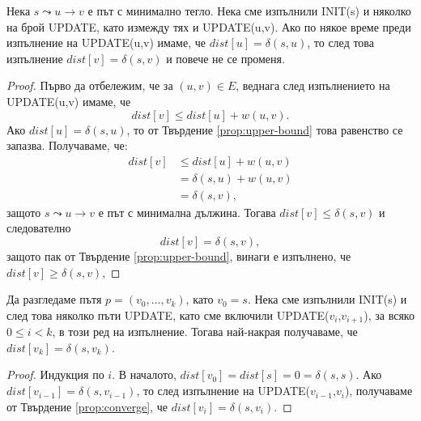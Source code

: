 \begin{prop}
  \label{prop:converge}
  Нека $s\leadsto u \to v$ е път с минимално тегло.
  Нека сме изпълнили INIT(s) и няколко на брой UPDATE, като измежду тях и UPDATE(u,v).
  Ако по някое време преди изпълнение на UPDATE(u,v) 
  имаме, че $dist[u] = \delta(s,u)$, то след това изпълнение
  $dist[v] = \delta(s,v)$ и повече не се променя.
\end{prop}
\begin{proof}
  Първо да отбележим, че за $(u,v) \in E$, веднага след изпълнението на UPDATE(u,v) имаме, че
  \[dist[v] \leq dist[u] + w(u,v).\]
  Ако $dist[u] = \delta(s,u)$, то от Твърдение \ref{prop:upper-bound} това равенство се запазва.
  Получаваме, че:
  \begin{align*}
    dist[v] & \leq dist[u] + w(u,v)\\
    & = \delta(s,u) + w(u,v)\\
    & = \delta(s,v),
  \end{align*}
  защото $s\leadsto u \to v$ е път с минимална дължина.
  Тогава $dist[v] \leq \delta(s,v)$ и следователно 
  \[dist[v] = \delta(s,v),\]
  защото пак от Твърдение \ref{prop:upper-bound}, винаги е изпълнено, че $dist[v] \geq \delta(s,v)$,
\end{proof}

\begin{prop}
  \label{prop:path-update}
  Да разгледаме пътя $p = (v_0,\dots,v_k)$, като $v_0 = s$.
  Нека сме изпълнили INIT(s) и след това няколко пъти UPDATE, като сме включили 
  UPDATE($v_{i}$,$v_{i+1}$), за всяко $0\leq i < k$, в този ред на изпълнение.
  Тогава най-накрая получаваме, че $dist[v_k] = \delta(s,v_k)$.
\end{prop}
\begin{proof}
  Индукция по $i$.
  В началото, $dist[v_0] = dist[s] = 0 = \delta(s,s)$.
  Ако $dist[v_{i-1}] = \delta(s,v_{i-1})$, то след изпълнение на UPDATE($v_{i-1}$,$v_{i}$),
  получаваме от Твърдение \ref{prop:converge}, че $dist[v_i] = \delta(s,v_{i})$.
\end{proof}

